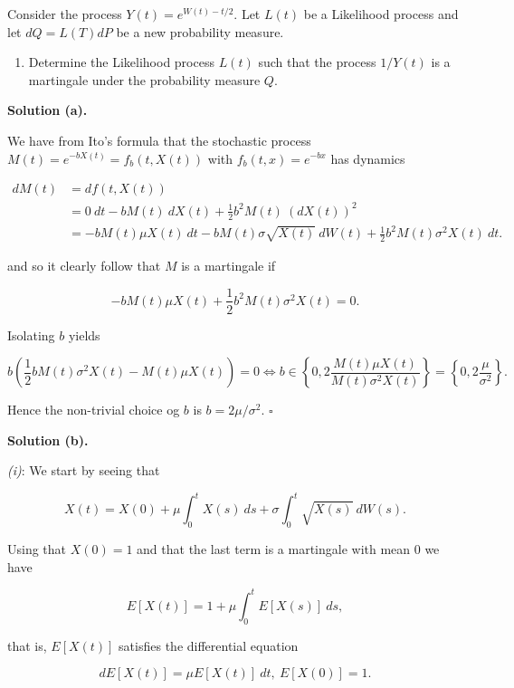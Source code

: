 \documentclass[
]{book}
\providecommand{\tightlist}{%
  \setlength{\itemsep}{0pt}\setlength{\parskip}{0pt}}
\begin{document}
Consider the process \(Y(t)=e^{W(t)-t/2}\). Let \(L(t)\) be a Likelihood process and let \(dQ=L(T)dP\) be a new probability measure.

\begin{enumerate}
\def\labelenumi{\alph{enumi}.}
\setcounter{enumi}{2}
\tightlist
\item
  Determine the Likelihood process \(L(t)\) such that the process \(1/Y(t)\) is a martingale under the probability measure \(Q\).
\end{enumerate}

\noindent\makebox[\linewidth]{\rule{\textwidth}{0.4pt}}

\textbf{Solution (a).}

We have from Ito's formula that the stochastic process \(M(t)=e^{-bX(t)}=f_b(t,X(t))\) with \(f_b(t,x)=e^{-bx}\) has dynamics

\begin{align*}
dM(t)&=df(t,X(t))\\
&=0\ dt-bM(t)\ dX(t)+\frac{1}{2}b^2M(t)\ (dX(t))^2\\
&=-bM(t)\mu X(t)\ dt-bM(t)\sigma \sqrt{X(t)}\ dW(t)+\frac{1}{2}b^2M(t)\sigma^2 X(t)\ dt.
\end{align*}

and so it clearly follow that \(M\) is a martingale if

\[
-bM(t)\mu X(t)+\frac{1}{2}b^2M(t)\sigma^2 X(t)=0.
\]

Isolating \(b\) yields

\[
b\left(\frac{1}{2}b M(t)\sigma^2 X(t)-M(t)\mu X(t)\right)=0\iff b\in\left\{0,2\frac{M(t)\mu X(t)}{M(t)\sigma^2 X(t)}\right\}=\left\{0,2\frac{\mu }{\sigma^2 }\right\}.
\]

Hence the non-trivial choice og \(b\) is \(b=2\mu/\sigma^2\). \(\square\)

\noindent\makebox[\linewidth]{\rule{\textwidth}{0.4pt}}

\textbf{Solution (b).}

\emph{(i)}: We start by seeing that

\[
X(t)=X(0)+\mu\int_0^t X(s)\ ds+\sigma\int_0^t\sqrt{X(s)}\ dW(s).
\]

Using that \(X(0)=1\) and that the last term is a martingale with mean 0 we have

\[
E[X(t)]=1+\mu\int_0^tE[X(s)]\ ds,
\]

that is, \(E[X(t)]\) satisfies the differential equation

\[
dE[X(t)]=\mu E[X(t)]\ dt,\ E[X(0)]=1.
\]
\end{document}

